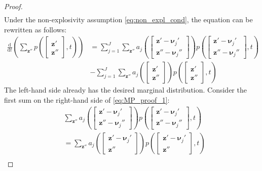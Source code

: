\begin{proof}
\begin{align*}
    \end{align*}
    Under the non-explosivity assumption \eqref{eq:non_expl_cond}, the equation can be rewritten as follows:
    \begin{equation}
    \label{eq:MP_proof_1} 
    \begin{aligned}
         \frac{\mathrm{d}}{\mathrm{d} t} \left( \sum_{{\boldsymbol{z}}'' } p \left( \begin{bmatrix} \boldsymbol{z}' \\ {\boldsymbol{z}}'' \end{bmatrix}, t \right) \right)
         &= \sum_{j=1}^{J} \sum_{{\boldsymbol{z}}'' } a_j \left( \begin{bmatrix} \boldsymbol{z}' - \boldsymbol{\nu}_j' \\ {\boldsymbol{z}}'' - \boldsymbol{\nu}_j'' \end{bmatrix} \right) p \left( \begin{bmatrix} \boldsymbol{z}' - \boldsymbol{\nu}_j' \\ {\boldsymbol{z}}'' - \boldsymbol{\nu}_j'' \end{bmatrix}, t \right)  \\
         &- \sum_{j=1}^{J} \sum_{{\boldsymbol{z}}'' } a_j \left( \begin{bmatrix} \boldsymbol{z}' \\ {\boldsymbol{z}}'' \end{bmatrix} \right) p \left( \begin{bmatrix} \boldsymbol{z}' \\ {\boldsymbol{z}}'' \end{bmatrix}, t \right)
    \end{aligned}
    \end{equation}
    The left-hand side already has the desired marginal distribution. Consider the first sum on the right-hand side of \eqref{eq:MP_proof_1}:
    \begin{align*}
        &\sum_{{\boldsymbol{z}}'' } a_j \left( \begin{bmatrix} \boldsymbol{z}' - \boldsymbol{\nu}_j' \\ {\boldsymbol{z}}'' - \boldsymbol{\nu}_j''\end{bmatrix} \right) p \left( \begin{bmatrix}\boldsymbol{z}' - \boldsymbol{\nu}_j' \\ {\boldsymbol{z}}'' - \boldsymbol{\nu}_j'' \end{bmatrix}, t \right) \\ 
        &= \sum_{{\boldsymbol{z}}'' } a_j \left( \begin{bmatrix} \boldsymbol{z}' - \boldsymbol{\nu}_j' \\ {\boldsymbol{z}}'' \end{bmatrix} \right) p \left( \begin{bmatrix} \boldsymbol{z}' - \boldsymbol{\nu}_j' \\ {\boldsymbol{z}}'' \end{bmatrix}, t \right) \\

\end{align*}
\end{proof}
